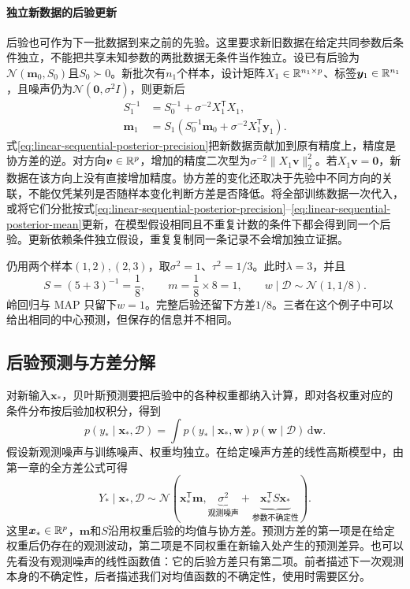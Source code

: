 \paragraph{独立新数据的后验更新}
后验也可作为下一批数据到来之前的先验。这里要求新旧数据在给定共同参数后条件独立，不能把共享未知参数的两批数据无条件当作独立。设已有后验为$\mathcal N(\bm m_0,S_0)$且$S_0\succ0$。新批次有$n_1$个样本，设计矩阵$X_1\in\mathbb{R}^{n_1\times p}$、标签$\bm y_1\in\mathbb{R}^{n_1}$，且噪声仍为$\mathcal N(\bm0,\sigma^2I)$，则更新后
\begin{align}
 S_1^{-1}&=S_0^{-1}+\sigma^{-2}X_1^{\mathsf T}X_1,\label{eq:linear-sequential-posterior-precision}\\
 \bm m_1&=S_1\left(S_0^{-1}\bm m_0+\sigma^{-2}X_1^{\mathsf T}\bm y_1\right).
 \label{eq:linear-sequential-posterior-mean}
\end{align}
式\eqref{eq:linear-sequential-posterior-precision}把新数据贡献加到原有精度上，精度是协方差的逆。对方向$\bm v\in\mathbb{R}^p$，增加的精度二次型为$\sigma^{-2}\|X_1\bm v\|_2^2$。若$X_1\bm v=\bm0$，新数据在该方向上没有直接增加精度。协方差的变化还取决于先验中不同方向的关联，不能仅凭某列是否随样本变化判断方差是否降低。将全部训练数据一次代入，或将它们分批按式\eqref{eq:linear-sequential-posterior-precision}--\eqref{eq:linear-sequential-posterior-mean}更新，在模型假设相同且不重复计数的条件下都会得到同一个后验。更新依赖条件独立假设，重复复制同一条记录不会增加独立证据。

仍用两个样本$(1,2),(2,3)$，取$\sigma^2=1$、$\tau^2=1/3$。此时$\lambda=3$，并且
\begin{equation}
 S=(5+3)^{-1}=\frac18,\qquad m=\frac18\times8=1,
 \qquad w\mid\mathcal D\sim\mathcal N(1,1/8).
\end{equation}
岭回归与 MAP 只留下$w=1$。完整后验还留下方差$1/8$。三者在这个例子中可以给出相同的中心预测，但保存的信息并不相同。

\subsection{后验预测与方差分解}
对新输入$\bm x_*$，贝叶斯预测要把后验中的各种权重都纳入计算，即对各权重对应的条件分布按后验加权积分，得到
\begin{equation}
 p(y_*\mid\bm x_*,\mathcal D)=
 \int p(y_*\mid\bm x_*,\bm w)p(\bm w\mid\mathcal D)\,\mathrm d\bm w.
\end{equation}
假设新观测噪声与训练噪声、权重均独立。在给定噪声方差的线性高斯模型中，由第一章的全方差公式可得
\begin{equation}
 Y_*\mid\bm x_*,\mathcal D\sim
 \mathcal N(\bm x_*^{\mathsf T}\bm m,
 \underbrace{\sigma^2}_{\text{观测噪声}}
 +\underbrace{\bm x_*^{\mathsf T}S\bm x_*}_{\text{参数不确定性}}).
\end{equation}
这里$\bm x_*\in\mathbb{R}^p$，$\bm m$和$S$沿用权重后验的均值与协方差。预测方差的第一项是在给定权重后仍存在的观测波动，第二项是不同权重在新输入处产生的预测差异。也可以先看没有观测噪声的线性函数值：它的后验方差只有第二项。前者描述下一次观测本身的不确定性，后者描述我们对均值函数的不确定性，使用时需要区分。

